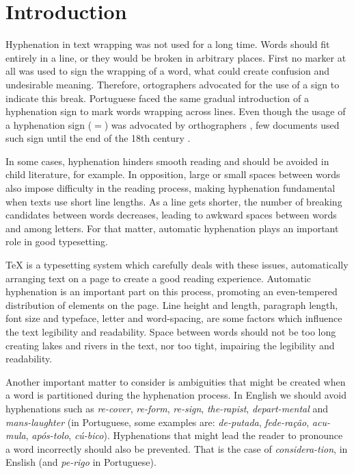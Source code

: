 \documentclass{article}
\begin{document}
\section{Introduction}\label{sec-intro}
Hyphenation in text wrapping was not used for a long time. Words should fit
entirely in a line, or they would be broken in arbitrary places. First no
marker at all was used to sign the wrapping of a word, what could create
confusion and undesirable meaning. Therefore, ortographers advocated for the
use of a sign to indicate this break. Portuguese faced the same gradual
introduction of a hyphenation sign to mark words wrapping across lines. Even
though the usage of a hyphenation sign ($=$) was advocated by orthographers
\cite{gandavo1574}, few documents used such sign until the end of the 18th
century \cite{araujo2015}.

In some cases, hyphenation hinders smooth reading and should be avoided in
child literature, for example. In opposition, large or small spaces between
words also impose difficulty in the reading process, making hyphenation
fundamental when texts use short line lengths. As a line gets shorter, the
number of breaking candidates between words decreases, leading to awkward
spaces between words and among letters. For that matter, automatic hyphenation
plays an important role in good typesetting.


\TeX{} is a typesetting system which carefully deals with these issues,
automatically arranging text on a page to create a good reading experience.
Automatic hyphenation is an important part on this process,
promoting an even-tempered distribution of elements on the page.
Line height and length, paragraph length, font size and typeface,
letter and word-spacing, are some factors which influence the text legibility
and readability. Space between words should not be too long creating lakes and
rivers in the text, nor too tight, impairing the legibility and readability.

Another important matter to consider is ambiguities that might be created when
a word is partitioned during the hyphenation process. In English we should
avoid hyphenations such as \emph{re-cover}, \emph{re-form}, \emph{re-sign}, \emph{the-rapist},
\emph{depart-mental} and \emph{mans-laughter} (in Portuguese, some examples are:
\emph{de-putada}, \emph{fede-ração}, \emph{acu-mula}, \emph{após-tolo},
\emph{cú-bico}). Hyphenations that might lead the reader to pronounce a word
incorrectly should also be prevented. That is the case of
\emph{considera-tion}, in Enslish (and \emph{pe-rigo} in Portuguese).
\end{document}
